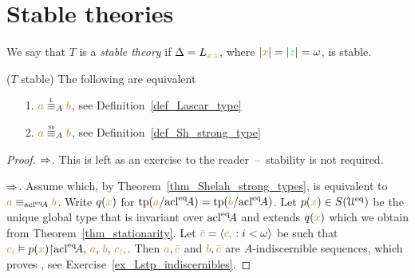 

\section{Stable theories}
\label{stable_theories}
 We say that $T$ is a \emph{stable theory\/} if $\Delta=L_{{\color{brown} x}\,{\color{green} z}}$, where $|{\color{brown} x}|=|{\color{green} z}|=\omega$, is stable.

\begin{corollary}\label{corol_Ltype_Shtype}
  ($T$ stable)
  The following are equivalent\smallskip
  \begin{itemize}
  \item[1.] ${\mr a}\equivL_A{\mr b}$, see Definition~\ref{def_Lascar_type}\smallskip
  \item[2.] ${\mr a}\equivSh_A{\mr b}$, see Definition~\ref{def_Sh_strong_type}\smallskip
  \end{itemize}
  \end{corollary}
  \begin{proof}$\Rightarrow$.
    This is left as an exercise to the reader~--~stability is not required.
  
    $\Rightarrow$.
    Assume  which, by Theorem~\ref{thm_Shelah_strong_types}, is equivalent to ${\color{brown} a}\equiv_{{\rm acl}^{{\rm eq}}\!A}{\color{brown} b}$.
    Write $q({\color{brown} x})$ for ${\rm tp}({\color{brown} a}/{{\rm acl}}^{{\rm eq}}\!A)={\rm tp}({\color{brown} b}/{{\rm acl}}^{{\rm eq}}\!A)$. Let $p({\color{brown} x})\in S(\EuScript U^{{\rm eq}})$ be the unique global type that is invariant over ${\rm acl}^{{\rm eq}}\!A$ and extends $q({\color{brown} x})$ which we obtain from Theorem~\ref{thm_stationarity}.
    Let ${\color{brown}\bar c}=\langle{\color{brown}c_i}:i<\omega\rangle$ be such that ${\color{brown} c_i}\vDash p({\color{brown} x}){\restriction}{\rm acl}^{{\rm eq}}\!A,\,{\color{brown} a},\,{\color{brown} b},\,{\color{brown} c_{\restriction i}}$.
    Then ${\color{brown} a},{\color{brown}\bar c}$ and ${\color{brown} b},{\color{brown}\bar c}$ are $A$-indiscernible sequences, which proves , see Exercise~\ref{ex_Lstp_indiscernibles}.
  \end{proof}
  

\def\medrel#1{\parbox[t]{6ex}{$\displaystyle\hfil #1$}}
\def\ceq#1#2#3{\parbox[t]{15ex}{$\displaystyle #1$}\medrel{#2}$\displaystyle  #3$}

